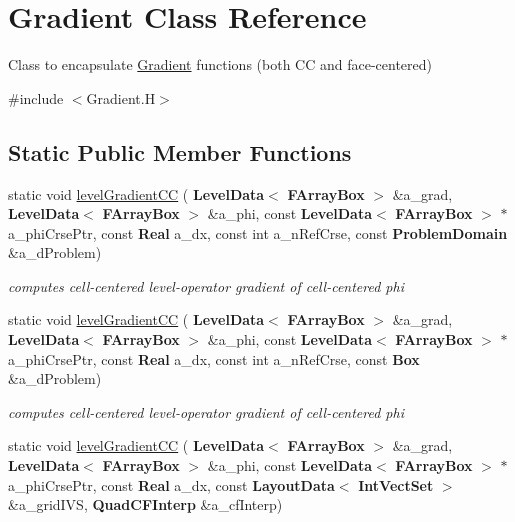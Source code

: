\hypertarget{class_gradient}{}\section{Gradient Class Reference}
\label{class_gradient}


Class to encapsulate \hyperlink{class_gradient}{Gradient} functions (both CC and face-\/centered)  




{\ttfamily \#include $<$Gradient.\+H$>$}

\subsection*{Static Public Member Functions}
\begin{DoxyCompactItemize}
\item 
static void \hyperlink{class_gradient_aa657ff462b1dd44565ab4e5c35c097fa}{level\+Gradient\+CC} (\textbf{ Level\+Data}$<$ \textbf{ F\+Array\+Box} $>$ \&a\+\_\+grad, \textbf{ Level\+Data}$<$ \textbf{ F\+Array\+Box} $>$ \&a\+\_\+phi, const \textbf{ Level\+Data}$<$ \textbf{ F\+Array\+Box} $>$ $\ast$a\+\_\+phi\+Crse\+Ptr, const \textbf{ Real} a\+\_\+dx, const int a\+\_\+n\+Ref\+Crse, const \textbf{ Problem\+Domain} \&a\+\_\+d\+Problem)
\begin{DoxyCompactList}\small\item\em computes cell-\/centered level-\/operator gradient of cell-\/centered phi \end{DoxyCompactList}\item 
static void \hyperlink{class_gradient_a9e85cf629d0e4b0ad7809c0db1f0322c}{level\+Gradient\+CC} (\textbf{ Level\+Data}$<$ \textbf{ F\+Array\+Box} $>$ \&a\+\_\+grad, \textbf{ Level\+Data}$<$ \textbf{ F\+Array\+Box} $>$ \&a\+\_\+phi, const \textbf{ Level\+Data}$<$ \textbf{ F\+Array\+Box} $>$ $\ast$a\+\_\+phi\+Crse\+Ptr, const \textbf{ Real} a\+\_\+dx, const int a\+\_\+n\+Ref\+Crse, const \textbf{ Box} \&a\+\_\+d\+Problem)
\begin{DoxyCompactList}\small\item\em computes cell-\/centered level-\/operator gradient of cell-\/centered phi \end{DoxyCompactList}\item 
static void \hyperlink{class_gradient_a6a14b8f09f7882545497dcccac01e35e}{level\+Gradient\+CC} (\textbf{ Level\+Data}$<$ \textbf{ F\+Array\+Box} $>$ \&a\+\_\+grad, \textbf{ Level\+Data}$<$ \textbf{ F\+Array\+Box} $>$ \&a\+\_\+phi, const \textbf{ Level\+Data}$<$ \textbf{ F\+Array\+Box} $>$ $\ast$a\+\_\+phi\+Crse\+Ptr, const \textbf{ Real} a\+\_\+dx, const \textbf{ Layout\+Data}$<$ \textbf{ Int\+Vect\+Set} $>$ \&a\+\_\+grid\+I\+VS, \textbf{ Quad\+C\+F\+Interp} \&a\+\_\+cf\+Interp)

\end{DoxyCompactItemize}
